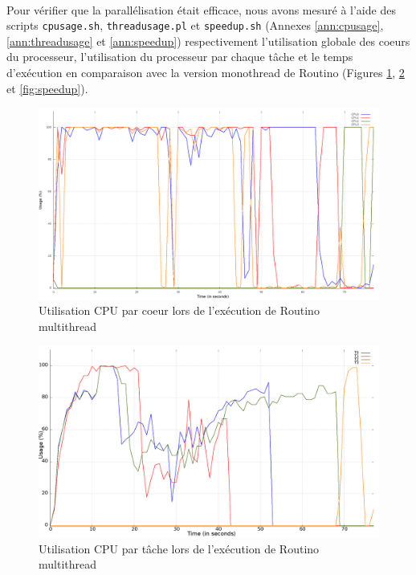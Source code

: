 \paragraph{}
Pour vérifier que la parallélisation était efficace, nous avons mesuré à l'aide
des scripts \texttt{cpusage.sh}, \texttt{threadusage.pl} et \texttt{speedup.sh}
(Annexes \ref{ann:cpusage}, \ref{ann:threadusage} et \ref{ann:speedup})
respectivement l'utilisation globale des coeurs du processeur, l'utilisation du
processeur par chaque tâche et le temps d'exécution en comparaison avec la 
version monothread de Routino (Figures \ref{fig:cpusage}, \ref{fig:threadusage}
et \ref{fig:speedup}).

\begin{figure}[H]
\centering
\includegraphics[scale=0.285]{include/cpu_usage.png}
\caption{Utilisation CPU par coeur lors de l'exécution de Routino multithread}
\label{fig:cpusage}
\end{figure}

\begin{figure}[H]
\centering
\includegraphics[scale=0.285]{include/thread_usage.png}
\caption{Utilisation CPU par tâche lors de l'exécution de Routino multithread}
\label{fig:threadusage}
\end{figure}

